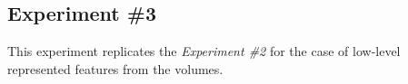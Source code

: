 %

\subsection{Experiment \#3}\label{subsec:exp3}
%
%
%
%

This experiment replicates the \emph{Experiment \#2} for the case of low-level represented features from the volumes.

